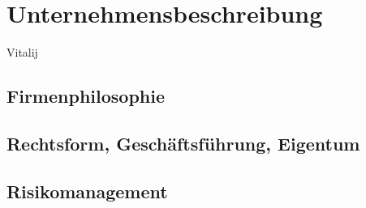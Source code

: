 
\section{Unternehmensbeschreibung}
Vitalij

\subsection{Firmenphilosophie}
\subsection{Rechtsform, Geschäftsführung, Eigentum}
\subsection{Risikomanagement}